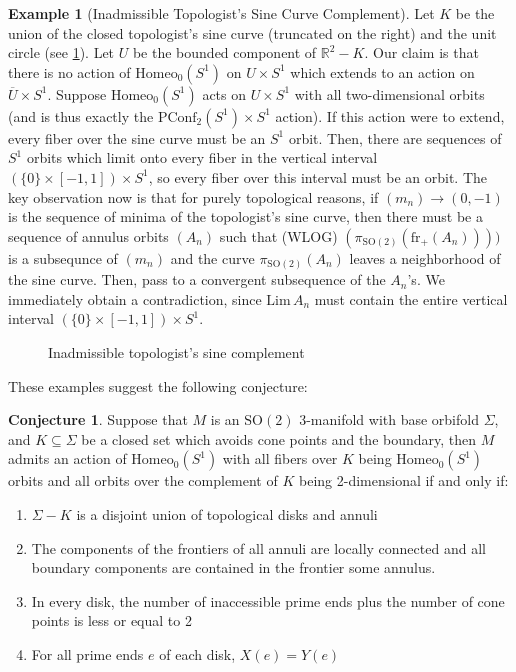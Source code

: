 \documentclass[10pt, oneside]{article}
\newcommand{\R}{\mathbb{R}}
\newcommand{\SO}[1][2]{\text{SO}(#1)}
\newcommand{\homeo}[1][S^1]{\text{Homeo}_0(#1)}
\newcommand{\cl}[1]{\overline{#1}}
\newcommand{\pconf}[2][S^1]{\text{PConf}_{#2}(#1)}
\newcommand{\klim}[1]{\text{Lim}\,#1}
\theoremstyle{definition}
\newtheorem{eg}{Example}[section]
\newtheorem{conj}{Conjecture}[section]
\theoremstyle{definition}
\begin{document}
\begin{eg}[Inadmissible Topologist's Sine Curve Complement]
    Let $K$ be the union of the closed topologist's sine curve (truncated on the right) and the unit circle (see \cref{fig:inadmissible-top-sin}). Let $U$ be the bounded component of $\R^2 - K$. Our claim is that there is no action of $\homeo$ on $U\times S^1$ which extends to an action on $\cl{U}\times S^1$. Suppose $\homeo$ acts on $U\times S^1$ with all two-dimensional orbits (and is thus exactly the $\pconf{2}\times S^1$ action). If this action were to extend, every fiber over the sine curve must be an $S^1$ orbit. Then, there are sequences of $S^1$ orbits which limit onto every fiber in the vertical interval $(\{0\}\times [-1, 1])\times S^1$, so every fiber over this interval must be an orbit. The key observation now is that for purely topological reasons, if $(m_n)\to (0,-1)$ is the sequence of minima of the topologist's sine curve, then there must be a sequence of annulus orbits $(A_n)$ such that (WLOG) $(\pi_{\SO}(\text{fr}_{+}(A_n))))$ is a subsequnce of $(m_n)$ and the curve $\pi_{\SO}(A_n)$ leaves a neighborhood of the sine curve. Then, pass to a convergent subsequence of the $A_n$'s. We immediately obtain a contradiction, since $\klim{A_n}$ must contain the entire vertical interval $(\{0\}\times[-1, 1])\times S^1$.
\end{eg}
\begin{figure}[t]
\centering
\begin{minipage}{.5\textwidth}
    \centering
    
    \caption{Admissible spiral complement}
    \label{fig:admissible-spiral}
\end{minipage}%
\begin{minipage}{.5\textwidth}
    \centering
    
    \caption{Inadmissible topologist's sine complement}
    \label{fig:inadmissible-top-sin}
\end{minipage}
\end{figure}

These examples suggest the following conjecture:
\begin{conj}\label{conj:one-and-two-d-orbits}
    Suppose that $M$ is an $\SO$ 3-manifold with base orbifold $\Sigma$, and $K\subseteq\Sigma$ be a closed set which avoids cone points and the boundary, then $M$ admits an action of $\homeo$ with all fibers over $K$ being $\homeo$ orbits and all orbits over the complement of $K$ being 2-dimensional if and only if:
    \begin{enumerate}
        \item $\Sigma - K$ is a disjoint union of topological disks and annuli
        \item The components of the frontiers of all annuli are locally connected and all boundary components are contained in the frontier some annulus.
        \item In every disk, the number of inaccessible prime ends plus the number of cone points is less or equal to 2
        \item For all prime ends $e$ of each disk, $X(e) = Y(e)$
    \end{enumerate}
\end{conj}
\end{document}
